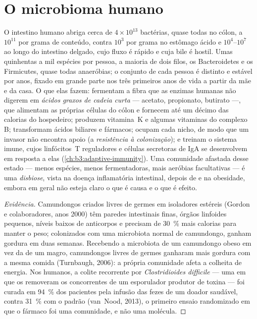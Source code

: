 \section{O microbioma humano}

\begin{definition}\label{def:b3:microbiomes:gut}
O intestino humano abriga cerca de $4\times 10^{13}$ bactérias, quase
todas no cólon, a $10^{11}$ por grama de conteúdo, contra $10^{3}$ por
grama no estômago ácido e $10^{4}$--$10^{7}$ ao longo do intestino
delgado, cujo fluxo é rápido e cuja bile é hostil. Umas quinhentas a
mil espécies por pessoa, a maioria de dois filos, os Bacteroidetes e os
Firmicutes, quase todas anaeróbias; o conjunto de cada pessoa é
distinto e estável por anos, fixado em grande parte nos três primeiros
anos de vida a partir da mãe e da casa. O que elas fazem: fermentam a
fibra que as enzimas humanas não digerem em \emph{ácidos graxos de
cadeia curta} --- acetato, propionato, butirato ---, que alimentam as
próprias células do cólon e fornecem até um décimo das calorias do
hospedeiro; produzem vitamina~K e algumas vitaminas do complexo B;
transformam ácidos biliares e fármacos; ocupam cada nicho, de modo que
um invasor não encontra apoio (a \emph{resistência à colonização}); e
treinam o sistema imune, cujos linfócitos~T reguladores e células
secretoras de IgA se desenvolvem em resposta a elas
(\cref{ch:b3:adaptive-immunity}). Uma comunidade afastada desse estado
--- menos espécies, menos fermentadoras, mais aeróbias facultativas ---
é uma \emph{disbiose}, vista na doença inflamatória intestinal, depois
de  e na obesidade, embora em geral não esteja claro o que
é causa e o que é efeito.
\end{definition}

\begin{proof}[Evidência]
Camundongos criados livres de germes em isoladores estéreis (Gordon e
colaboradores, anos 2000) têm paredes intestinais finas, órgãos
linfoides pequenos, níveis baixos de anticorpos e precisam de
\qty{30}{\%} mais calorias para manter o peso; colonizados com uma
microbiota normal de camundongo, ganham gordura em duas semanas.
Recebendo a microbiota de um camundongo obeso em vez da de um magro,
camundongos livres de germes ganharam mais gordura com a mesma comida
(Turnbaugh, 2006): a própria comunidade afeta a colheita de energia.
Nos humanos, a colite recorrente por \emph{Clostridioides difficile}
--- uma  em que os  removeram os concorrentes de um
esporulador produtor de toxina --- foi curada em \qty{94}{\%} dos
pacientes pela infusão das fezes de um doador saudável, contra
\qty{31}{\%} com o  padrão (van~Nood, 2013), o primeiro
ensaio randomizado em que o fármaco foi uma comunidade, e não uma
molécula.
\end{proof}

